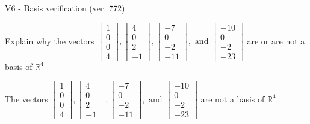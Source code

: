 \begin{exercise}
  \begin{exerciseTitle}V6 - Basis verification (ver. 772)\end{exerciseTitle}
  \begin{exerciseStatement}
    Explain why the vectors \(\left[\begin{array}{r}
1 \\
0 \\
0 \\
4
\end{array}\right] , \left[\begin{array}{r}
4 \\
0 \\
2 \\
-1
\end{array}\right] , \left[\begin{array}{r}
-7 \\
0 \\
-2 \\
-11
\end{array}\right] , \text{ and } \left[\begin{array}{r}
-10 \\
0 \\
-2 \\
-23
\end{array}\right]\) are or are not a basis of \(\mathbb{R}^4\)	


  \end{exerciseStatement}
  \begin{exerciseAnswer}
   The vectors \(\left[\begin{array}{r}
1 \\
0 \\
0 \\
4
\end{array}\right] , \left[\begin{array}{r}
4 \\
0 \\
2 \\
-1
\end{array}\right] , \left[\begin{array}{r}
-7 \\
0 \\
-2 \\
-11
\end{array}\right] , \text{ and } \left[\begin{array}{r}
-10 \\
0 \\
-2 \\
-23
\end{array}\right]\) 
  	 are not  a basis of \(\mathbb{R}^4\).
  


  \end{exerciseAnswer}
\end{exercise}